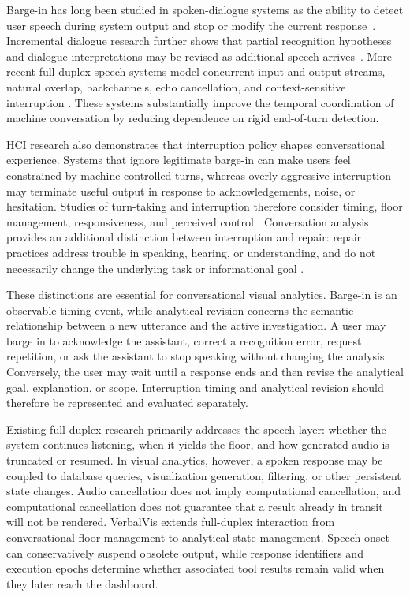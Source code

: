\documentclass[journal]{IEEEtran}
\begin{document}
Barge-in has long been studied in spoken-dialogue systems as the ability to
detect user speech during system output and stop or modify the current
response~\cite{heins1997bargein}. Incremental dialogue research further shows
that partial recognition hypotheses and dialogue interpretations may be
revised as additional speech arrives~\cite{schlangen2011general}. More recent
full-duplex speech systems model concurrent input and output streams, natural
overlap, backchannels, echo cancellation, and context-sensitive interruption
\cite{lin2022duplex,wang2024fullduplex,veluri2024syncllm,
defossez2024moshi,yu2025salmonnomni}. These systems substantially improve the
temporal coordination of machine conversation by reducing dependence on rigid
end-of-turn detection.

HCI research also demonstrates that interruption policy shapes conversational
experience. Systems that ignore legitimate barge-in can make users feel
constrained by machine-controlled turns, whereas overly aggressive
interruption may terminate useful output in response to acknowledgements,
noise, or hesitation. Studies of turn-taking and interruption therefore
consider timing, floor management, responsiveness, and perceived control
\cite{cumbal2024finish,skantze2021turntaking}. Conversation analysis provides
an additional distinction between interruption and repair: repair practices
address trouble in speaking, hearing, or understanding, and do not necessarily
change the underlying task or informational goal
\cite{schegloff1977preference}.

These distinctions are essential for conversational visual analytics.
Barge-in is an observable timing event, while analytical revision concerns the
semantic relationship between a new utterance and the active investigation. A
user may barge in to acknowledge the assistant, correct a recognition error,
request repetition, or ask the assistant to stop speaking without changing the
analysis. Conversely, the user may wait until a response ends and then revise
the analytical goal, explanation, or scope. Interruption timing and analytical
revision should therefore be represented and evaluated separately.

Existing full-duplex research primarily addresses the speech layer: whether
the system continues listening, when it yields the floor, and how generated
audio is truncated or resumed. In visual analytics, however, a spoken response
may be coupled to database queries, visualization generation, filtering, or
other persistent state changes. Audio cancellation does not imply
computational cancellation, and computational cancellation does not guarantee
that a result already in transit will not be rendered. VerbalVis extends
full-duplex interaction from conversational floor management to analytical
state management. Speech onset can conservatively suspend obsolete output,
while response identifiers and execution epochs determine whether associated
tool results remain valid when they later reach the dashboard.
\end{document}
